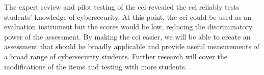 


The expert review and pilot testing of the \gls{cci} revealed the \gls{cci} reliably tests students' knowledge of cybersecurity. At this point, the \gls{cci} could be used as an evaluation instrument but the scores would be low, reducing the discriminatory power of the assessment. By making the \gls{cci} easier, we will be able to create an assessment that should be broadly applicable and provide useful measurements of a broad range of cybersecurity students. Further research will cover the modifications of the items and testing with more students. 
